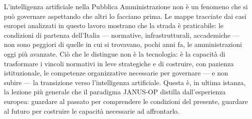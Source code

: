 \medskip

L'intelligenza artificiale nella Pubblica Amministrazione non è un fenomeno che si
può governare aspettando che altri lo facciano prima. Le mappe tracciate dai casi
europei analizzati in questo lavoro mostrano che la strada è praticabile: le
condizioni di partenza dell'Italia --- normative, infrastrutturali, accademiche ---
non sono peggiori di quelle in cui si trovavano, pochi anni fa, le amministrazioni
oggi più avanzate. Ciò che le distingue non è la tecnologia: è la capacità di
trasformare i vincoli normativi in leve strategiche e di costruire, con pazienza
istituzionale, le competenze organizzative necessarie per governare --- e non subire
--- la transizione verso l'intelligenza artificiale. Questa è, in ultima istanza,
la lezione più generale che il paradigma JANUS-OP distilla dall'esperienza europea:
guardare al passato per comprendere le condizioni del presente, guardare al futuro
per costruire le capacità necessarie ad affrontarlo.
